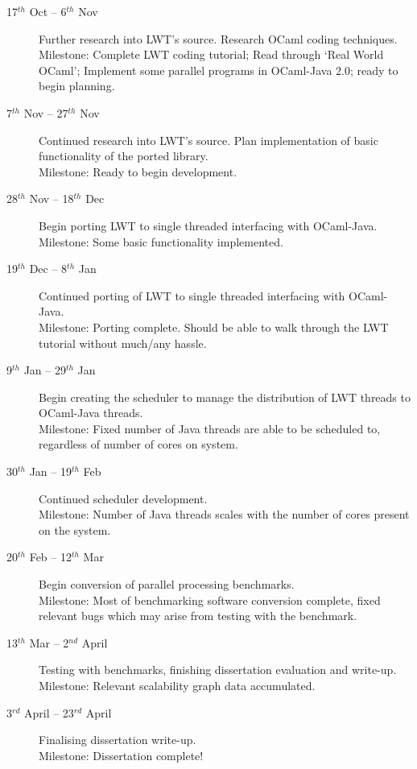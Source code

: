 \documentclass[a4paper]{article}
\begin{document}
\begin{description}
\item[17$^{th}$ Oct -- 6$^{th}$ Nov] Further research into LWT's source. Research OCaml coding techniques.\\
Milestone: Complete LWT coding tutorial; Read through `Real World OCaml'; Implement some parallel programs in OCaml-Java 2.0; ready to begin planning.

\item[7$^{th}$ Nov -- 27$^{th}$ Nov]
Continued research into LWT's source. Plan implementation of basic functionality of the ported library.\\
Milestone: Ready to begin development.

\item[28$^{th}$ Nov -- 18$^{th}$ Dec] Begin porting LWT to single threaded interfacing with OCaml-Java.\\
Milestone: Some basic functionality implemented.

\item[19$^{th}$ Dec -- 8$^{th}$ Jan] Continued porting of LWT to single threaded interfacing with OCaml-Java.\\
Milestone: Porting complete. Should be able to walk through the LWT tutorial without much/any hassle.

\item[9$^{th}$ Jan -- 29$^{th}$ Jan] Begin creating the scheduler to manage the distribution of LWT threads to OCaml-Java threads.\\
Milestone: Fixed number of Java threads are able to be scheduled to, regardless of number of cores on system.

\item[30$^{th}$ Jan -- 19$^{th}$ Feb] Continued scheduler development.\\
Milestone: Number of Java threads scales with the number of cores present on the system.

\item[20$^{th}$ Feb -- 12$^{th}$ Mar] Begin conversion of parallel processing benchmarks.\\
Milestone: Most of benchmarking software conversion complete, fixed relevant bugs which may arise from testing with the benchmark.

\item[13$^{th}$ Mar -- 2$^{nd}$ April] Testing with benchmarks, finishing dissertation evaluation and write-up.\\
Milestone: Relevant scalability graph data accumulated.

\item[3$^{rd}$ April -- 23$^{rd}$ April] Finalising dissertation write-up.\\
Milestone: Dissertation complete!

\end{description}
\end{document}
